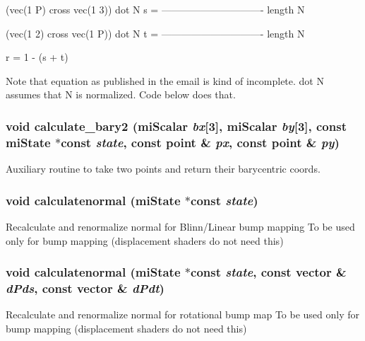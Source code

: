 (vec(1 P) cross vec(1 3)) dot N s = ------------------------------- length N

(vec(1 2) cross vec(1 P)) dot N t = ------------------------------- length N

r = 1 - (s + t)

Note that equation as published in the email is kind of incomplete. dot N assumes that N is normalized. Code below does that. 
\subsubsection{\setlength{\rightskip}{0pt plus 5cm}void calculate\_\-bary2 (mi\-Scalar {\em bx}[3], mi\-Scalar {\em by}[3], const mi\-State $\ast$const {\em state}, const point \& {\em px}, const point \& {\em py})\hspace{0.3cm}{\tt  [inline]}}\label{namespacemr_a29}


Auxiliary routine to take two points and return their barycentric coords. 

\subsubsection{\setlength{\rightskip}{0pt plus 5cm}void calculatenormal (mi\-State $\ast$const {\em state})\hspace{0.3cm}{\tt  [inline]}}\label{namespacemr_a23}


Recalculate and renormalize normal for Blinn/Linear bump mapping To be used only for bump mapping (displacement shaders do not need this) 
\subsubsection{\setlength{\rightskip}{0pt plus 5cm}void calculatenormal (mi\-State $\ast$const {\em state}, const vector \& {\em d\-Pds}, const vector \& {\em d\-Pdt})\hspace{0.3cm}{\tt  [inline]}}\label{namespacemr_a22}


Recalculate and renormalize normal for rotational bump map To be used only for bump mapping (displacement shaders do not need this) 
